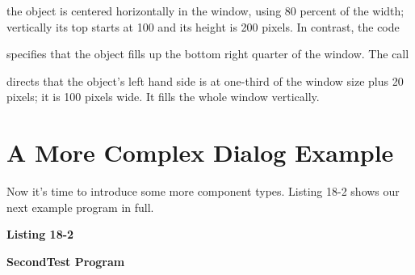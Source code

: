 
\noindent
the object is centered horizontally in the window, using 80
percent of the width; vertically its top starts at 100 and its
height is 200 pixels. In contrast, the code


\noindent
specifies that the object fills up the bottom right quarter of the
window. The call


\noindent
directs that the object's left hand side is at
one-third of the window size plus 20 pixels; it is 100 pixels wide. It
fills the whole window vertically.

\section{A More Complex Dialog Example}

Now it's time to introduce some more component types.
Listing 18-2 shows our next example program in full.

\bigskip

{\sffamily\bfseries
Listing 18-2}

{\sffamily\bfseries
SecondTest Program}

